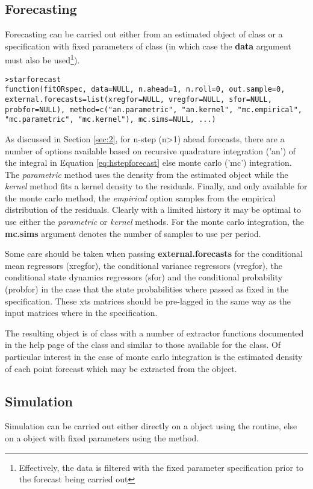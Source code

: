 \subsection{Forecasting}
Forecasting can be carried out either from an estimated object of class
 or a specification with fixed parameters of class
 (in which case the \textbf{data} argument must also be
used\footnote{Effectively, the data is filtered with the fixed parameter
specification prior to the forecast being carried out}).
\begin{lstlisting}
>starforecast
function(fitORspec, data=NULL, n.ahead=1, n.roll=0, out.sample=0, 
external.forecasts=list(xregfor=NULL, vregfor=NULL, sfor=NULL, 
probfor=NULL), method=c("an.parametric", "an.kernel", "mc.empirical", 
"mc.parametric", "mc.kernel"), mc.sims=NULL, ...) 
\end{lstlisting}
As discussed in Section \ref{sec:2}, for n-step (n>1) ahead forecasts,
there are a number of options available based on recursive quadrature
integration ('an') of the integral in Equation \ref{eq:hstepforecast} 
else monte carlo ('mc') integration. The \emph{parametric} method uses
the density from the estimated object while the \emph{kernel} method fits
a kernel density to the residuals. Finally, and only available for the monte
carlo method, the \emph{empirical} option samples from the empirical
distribution of the residuals. Clearly with a limited history it may be optimal
to use either the \emph{parametric} or \emph{kernel} methods. For the monte
carlo integration, the \textbf{mc.sims} argument denotes the number of samples
to use per period.

Some care should be taken when passing \textbf{external.forecasts} for the
conditional mean regressors (xregfor), the conditional variance regressors
(vregfor), the conditional state dynamics regressors (sfor) and the conditional
probability (probfor) in the case that the state probabilities where passed as
fixed in the specification. These xts matrices should be pre-lagged in the same
way as the input matrices where in the specification.

The resulting object is of class  with a number of extractor
functions documented in the help page of the class and similar to those
available for the  class. Of particular interest in the case of
monte carlo integration is the estimated density of each point forecast which
may be extracted from the object.

\subsection{Simulation}
Simulation can be carried out either directly on a  object using
the  routine, else on a  object with fixed
parameters using the  method.


